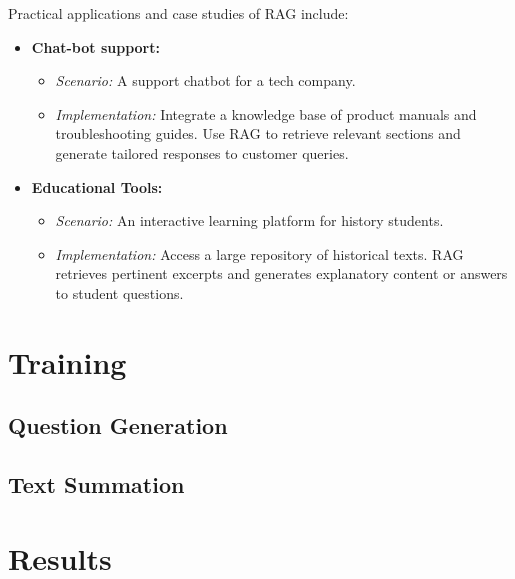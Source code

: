\newpage
Practical applications and case studies of RAG include:
\begin{itemize}
    \item \textbf{Chat-bot support:}
    \begin{itemize}
        \item \textit{Scenario:} A support chatbot for a tech company.
        \item \textit{Implementation:} Integrate a knowledge base of product manuals and troubleshooting guides. Use RAG to retrieve relevant sections and generate tailored responses to customer queries.
    \end{itemize}
    \item \textbf{Educational Tools:}
    \begin{itemize}
        \item \textit{Scenario:} An interactive learning platform for history students.
        \item \textit{Implementation:} Access a large repository of historical texts. RAG retrieves pertinent excerpts and generates explanatory content or answers to student questions.
    \end{itemize}
    
\end{itemize}



\newpage

\section{Training}
\subsection{Question Generation}
\subsection{Text Summation}

\section{Results}


